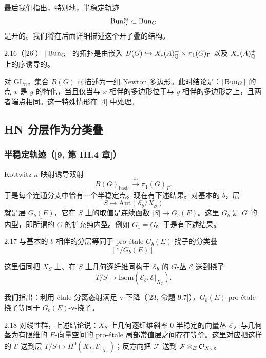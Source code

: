 最后我们指出，特别地，半稳定轨迹
\[
\operatorname{Bun}_G^{ss}\subset\operatorname{Bun}_G
\]
是开的。我们将在后面详细描述这个开子叠的结构。

\begin{thm}{2.16}（[26]）
$|\operatorname{Bun}_G|$ 的拓扑是由嵌入 $B(G)\hookrightarrow X_*(A)^+_{\mathbb{Q}}\times\pi_1(G)_\Gamma$ 以及 $X_*(A)^+_{\mathbb{Q}}$ 上的序诱导的。
\label{thm:a3-2-16}
\end{thm}

对 $\mathrm{GL}_n$，集合 $B(G)$ 可描述为一组 Newton 多边形。此时结论是：$|\operatorname{Bun}_G|$ 的点 $x$ 是 $y$ 的特化，当且仅当与 $x$ 相伴的多边形位于与 $y$ 相伴的多边形之上，且两者端点相同。这一特殊情形在 [4] 中处理。

\subsection{HN 分层作为分类叠}

\subsubsection{半稳定轨迹（[9, 第 III.4 章]）}

Kottwitz $\kappa$ 映射诱导双射
\[
B(G)_{\mathrm{basic}}\xrightarrow{\ \sim\ }\pi_1(G)_\Gamma.
\]
于是每个连通分支中恰有一个半稳定点。现在有下述结果。对基本的 $b$，层
\[
S\mapsto\mathrm{Aut}(\mathcal E_b/X_S)
\]
就是层 $\underline{G_b(E)}$，它在 $S$ 上的取值是连续函数 $|S|\to G_b(E)$。这里 $G_b$ 是 $G$ 的内型，即所谓的 $G$ 的扩充纯内型。例如 $G_1=G$。于是有下述结果。

\begin{thm}{2.17}
与基本的 $b$ 相伴的分层等同于 pro-étale $G_b(E)$-挠子的分类叠
\[
[*/G_b(E)].
\]
\label{thm:a3-2-17}
\end{thm}

这里恒同把 $X_S$ 上、在 $S$ 上几何逐纤维同构于 $\mathcal E_b$ 的 $G$-丛 $\mathcal E$ 送到挠子
\[
T/S\longmapsto\mathrm{Isom}(\mathcal E_b,\mathcal E|_{X_T}).
\]

我们指出：利用 étale 分离态射满足 v-下降（[23, 命题 9.7]），$G_b(E)$-pro-étale 挠子等同于 $G_b(E)$-v-挠子。

\begin{exam}{2.18}
对线性群，上述结论说：$X_S$ 上几何逐纤维斜率 $0$ 半稳定的向量丛 $\mathcal E$，与几何茎为有限维的 $E$-向量空间的 pro-étale 局部常值层之间存在等价。这里对应把这样的 $\mathcal E$ 送到层 $T/S\mapsto H^0(X_T,\mathcal E|_{X_T})$；反方向把 $\mathcal F$ 送到 $\mathcal F\otimes_E\mathcal{O}_{X_S}$。
\label{exam:a3-2-18}
\end{exam}

